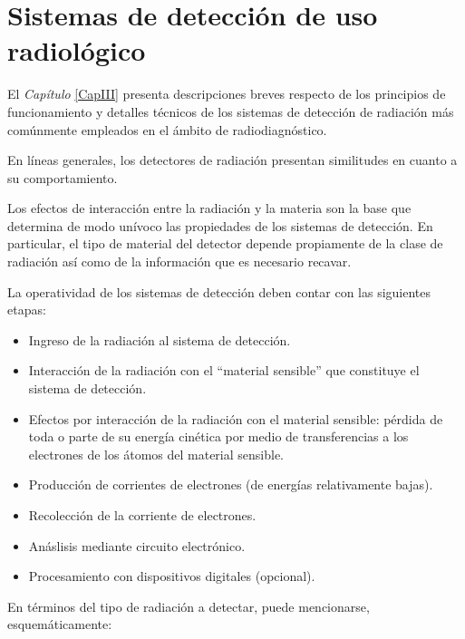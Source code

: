 \chapter{Sistemas de detecci\'on de uso radiol\'ogico}

El \textit{Cap\'itulo} \ref{CapIII} presenta descripciones breves respecto de los principios de funcionamiento y detalles t\'ecnicos 
de los sistemas de detecci\'on de radiaci\'on m\'as com\'unmente empleados en el \'ambito de radiodiagn\'ostico.

En l\'ineas generales, los detectores de radiaci\'on presentan similitudes en cuanto a su comportamiento.
%

%
Los efectos de interacci\'on entre la radiaci\'on y la materia son la base que determina de modo un\'ivoco las propiedades de los sistemas de
detecci\'on. En particular, el tipo de material del detector depende propiamente de la clase de radiaci\'on as\'i como de la informaci\'on que 
es necesario recavar.
%

%
La operatividad de los sistemas de detecci\'on deben contar con las siguientes etapas:

\begin{itemize}
 \item Ingreso de la radiaci\'on al sistema de detecci\'on.
 \item Interacci\'on de la radiaci\'on con el ``material sensible'' que constituye el sistema de detecci\'on.
 \item Efectos por interacci\'on de la radiaci\'on con el material sensible: p\'erdida de toda o parte de su energ\'ia cin\'etica por 
 medio de transferencias a los electrones de los \'atomos del material sensible.
 \item Producci\'on de corrientes de electrones (de energ\'ias relativamente bajas).
 \item Recolecci\'on de la corriente de electrones.
 \item An\'aslisis mediante circuito electr\'onico.
 \item Procesamiento con dispositivos digitales (opcional).
\end{itemize}

En t\'erminos del tipo de radiaci\'on a detectar, puede mencionarse, esquem\'aticamente:


